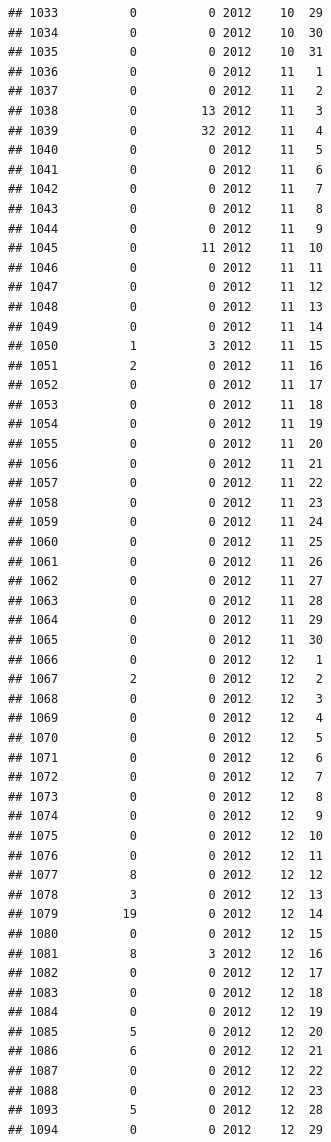 \documentclass[
]{article}
\begin{document}
\begin{verbatim}
## 1033          0          0 2012    10  29
## 1034          0          0 2012    10  30
## 1035          0          0 2012    10  31
## 1036          0          0 2012    11   1
## 1037          0          0 2012    11   2
## 1038          0         13 2012    11   3
## 1039          0         32 2012    11   4
## 1040          0          0 2012    11   5
## 1041          0          0 2012    11   6
## 1042          0          0 2012    11   7
## 1043          0          0 2012    11   8
## 1044          0          0 2012    11   9
## 1045          0         11 2012    11  10
## 1046          0          0 2012    11  11
## 1047          0          0 2012    11  12
## 1048          0          0 2012    11  13
## 1049          0          0 2012    11  14
## 1050          1          3 2012    11  15
## 1051          2          0 2012    11  16
## 1052          0          0 2012    11  17
## 1053          0          0 2012    11  18
## 1054          0          0 2012    11  19
## 1055          0          0 2012    11  20
## 1056          0          0 2012    11  21
## 1057          0          0 2012    11  22
## 1058          0          0 2012    11  23
## 1059          0          0 2012    11  24
## 1060          0          0 2012    11  25
## 1061          0          0 2012    11  26
## 1062          0          0 2012    11  27
## 1063          0          0 2012    11  28
## 1064          0          0 2012    11  29
## 1065          0          0 2012    11  30
## 1066          0          0 2012    12   1
## 1067          2          0 2012    12   2
## 1068          0          0 2012    12   3
## 1069          0          0 2012    12   4
## 1070          0          0 2012    12   5
## 1071          0          0 2012    12   6
## 1072          0          0 2012    12   7
## 1073          0          0 2012    12   8
## 1074          0          0 2012    12   9
## 1075          0          0 2012    12  10
## 1076          0          0 2012    12  11
## 1077          8          0 2012    12  12
## 1078          3          0 2012    12  13
## 1079         19          0 2012    12  14
## 1080          0          0 2012    12  15
## 1081          8          3 2012    12  16
## 1082          0          0 2012    12  17
## 1083          0          0 2012    12  18
## 1084          0          0 2012    12  19
## 1085          5          0 2012    12  20
## 1086          6          0 2012    12  21
## 1087          0          0 2012    12  22
## 1088          0          0 2012    12  23
## 1093          5          0 2012    12  28
## 1094          0          0 2012    12  29

\end{verbatim}
\end{document}
